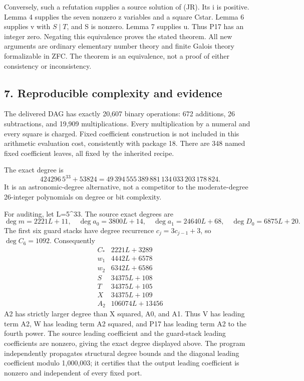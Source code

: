 Conversely, such a refutation supplies a source solution of (JR). Its i
is positive. Lemma 4 supplies the seven nonzero z variables and a square
Cstar. Lemma 6 supplies v with \(S\mid T\), and S is nonzero. Lemma 7
supplies u. Thus P17 has an integer zero. Negating this equivalence
proves the stated theorem. All new arguments are ordinary elementary
number theory and finite Galois theory formalizable in ZFC. The theorem
is an equivalence, not a proof of either consistency or inconsistency.

\hypertarget{reproducible-complexity-and-evidence}{%
\subsection{7. Reproducible complexity and
evidence}\label{reproducible-complexity-and-evidence}}

The delivered DAG has exactly 20,607 binary operations: 672 additions,
26 subtractions, and 19,909 multiplications. Every multiplication by a
numeral and every square is charged. Fixed coefficient construction is
not included in this arithmetic evaluation cost, consistently with
package 18. There are 348 named fixed coefficient leaves, all fixed by
the inherited recipe.

The exact degree is \[
 424296\,5^{33}+53824
 =49\,394\,555\,389\,881\,134\,033\,203\,178\,824.
\] It is an astronomic-degree alternative, not a competitor to the
moderate-degree 26-integer polynomials on degree or bit complexity.

For auditing, let L=5\^{}33. The source exact degrees are \[
 \deg m=2221L+11,\quad \deg a_0=3800L+14,\quad
 \deg a_1=24640L+68,\quad \deg D_0=6875L+20.
\] The first six guard stacks have degree recurrence \(c_j=3c_{j-1}+3\),
so \(\deg C_6=1092\). Consequently \[
\begin{array}{c|r}
 C_\ast&2221L+3289\\
 w_1&4442L+6578\\
 w_2&6342L+6586\\
 S&34375L+108\\
 T&34375L+105\\
 X&34375L+109\\
 A_2&106074L+13456
\end{array}
\] A2 has strictly larger degree than X squared, A0, and A1. Thus V has
leading term A2, W has leading term A2 squared, and P17 has leading term
A2 to the fourth power. The source leading coefficient and the
guard-stack leading coefficients are nonzero, giving the exact degree
displayed above. The program independently propagates structural degree
bounds and the diagonal leading coefficient modulo 1,000,003; it
certifies that the output leading coefficient is nonzero and independent
of every fixed port.

